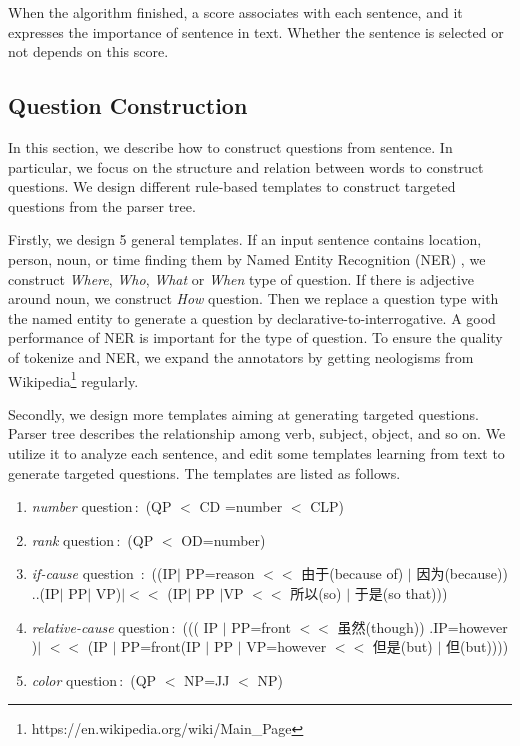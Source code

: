 \documentclass[runningheads,UTF8,article]{comsis2}
\begin{document}
	When the algorithm finished, a score associates with each sentence, and it expresses the importance of sentence in text. Whether the sentence is selected or not depends on this score.
	
	\subsection{Question Construction}
	In this section, we describe how to construct questions from sentence. In particular, we focus on the structure and relation between words to construct questions. We design different rule-based templates to construct targeted questions from the parser tree.
	
	Firstly, we design 5 general templates. If an input sentence contains location, person, noun, or time finding them by Named Entity Recognition (NER) , we construct \emph{Where}, \emph{Who}, \emph{What} or \emph{When} type of question. If there is adjective around noun, we construct \emph{How} question. Then we replace a question type with the named entity to generate a question by declarative-to-interrogative. A good performance of NER is important for the type of question. To ensure the quality of tokenize and NER, we expand the annotators by getting neologisms from Wikipedia\footnote{https://en.wikipedia.org/wiki/Main\_Page} regularly.
	
	Secondly, we design more templates aiming at generating targeted questions. Parser tree describes the relationship among verb, subject, object, and so on. We utilize it to analyze each sentence, and edit some templates learning from text to generate targeted questions. The templates are listed as follows.
	\begin{enumerate}
		\item{\emph{number} question\,:\, (QP $ < $ CD =number  $ < $ CLP)}
		\item{\emph{rank} question\,:\, (QP $ < $ OD=number)}
		\item{\emph{if-cause} question \,:\, ((IP$ | $ PP=reason $ << $ 由于(because of) $ | $ 因为(because)) ..(IP$ | $ PP$ | $ VP)$ |<< $ (IP$ | $ PP $ | $VP $ << $ 所以(so) $ | $ 于是(so that)))}
		\item{\emph{relative-cause} question\,:\, ((( IP $ | $ PP=front $ << $ 虽然(though)) .IP=however )$ | $ $<<$ (IP $|$ PP=front(IP $|$ PP $|$ VP=however $<<$ 但是(but) $|$ 但(but)))) }
		
		\item{\emph{color} question\,:\, (QP $ < $ NP=JJ $ < $ NP) }
		
	\end{enumerate}
	
\end{document}

